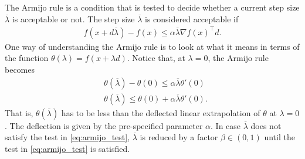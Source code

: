 The Armijo rule is a condition that is tested to decide whether a current step size $\overline{\lambda}$ is acceptable or not. The step size $\overline{\lambda}$ is considered acceptable if
%
\begin{align*}
f(x + d\overline{\lambda}) - f(x) \leq \alpha \overline{\lambda}\nabla f(x)^\top d.
\end{align*}
%
One way of understanding the Armijo rule is to look at what it means in terms of the function $\theta(\lambda) = f(x +\lambda d)$. Notice that, at $\lambda = 0$, the Armijo rule becomes
\begin{align}
& \theta(\overline{\lambda}) - \theta(0) \leq \alpha \overline{\lambda} \theta'(0) \nonumber \\ 
& \theta(\overline{\lambda}) \leq \theta(0) + \alpha \overline{\lambda}\theta'(0) \label{eq:armijo_test}.
\end{align}
That is, $\theta(\overline{\lambda})$ has to be less than the deflected linear extrapolation of $\theta$ at $\lambda = 0$. The deflection is given by the pre-specified parameter $\alpha$. In case $\overline{\lambda}$ does not satisfy the test in \eqref{eq:armijo_test}, $\overline{\lambda}$ is reduced by a factor $\beta \in (0,1)$ until the test in \eqref{eq:armijo_test} is satisfied. 
%

